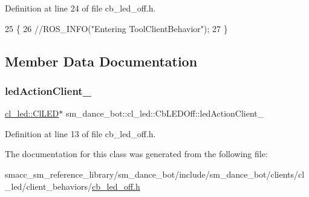 Definition at line 24 of file cb\+\_\+led\+\_\+off.\+h.


\begin{DoxyCode}
25   \{
26     \textcolor{comment}{//ROS\_INFO("Entering ToolClientBehavior");}
27   \}
\end{DoxyCode}


\subsection{Member Data Documentation}
\mbox{\label{classsm__dance__bot_1_1cl__led_1_1CbLEDOff_a338a86c573b1b9c9cc4af9459145d68e}} 
\subsubsection{\texorpdfstring{led\+Action\+Client\+\_\+}{ledActionClient\_}}
{\footnotesize\ttfamily \hyperlink{classsm__dance__bot_1_1cl__led_1_1ClLED}{cl\+\_\+led\+::\+Cl\+L\+ED}$\ast$ sm\+\_\+dance\+\_\+bot\+::cl\+\_\+led\+::\+Cb\+L\+E\+D\+Off\+::led\+Action\+Client\+\_\+}



Definition at line 13 of file cb\+\_\+led\+\_\+off.\+h.



The documentation for this class was generated from the following file\+:\begin{DoxyCompactItemize}
\item 
smacc\+\_\+sm\+\_\+reference\+\_\+library/sm\+\_\+dance\+\_\+bot/include/sm\+\_\+dance\+\_\+bot/clients/cl\+\_\+led/client\+\_\+behaviors/\hyperlink{include_2sm__dance__bot_2clients_2cl__led_2client__behaviors_2cb__led__off_8h}{cb\+\_\+led\+\_\+off.\+h}\end{DoxyCompactItemize}
